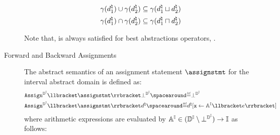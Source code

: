 \begin{description}
\begin{definition}
  \begin{align*}
    \gamma(d^\natural_1) \cup \gamma(d^\natural_2) &\subseteq \gamma(d^\natural_1 \sqcup d^\natural_2) \\
    \gamma(d^\natural_1) \cap \gamma(d^\natural_2) &\subseteq \gamma(d^\natural_1 \sqcap d^\natural_2)
  \end{align*}
  \end{definition}
  Note that,  is always satisfied for best abstractions operators, \cf{} .
  \item[Forward and Backward Assignments]
  The abstract semantics of an assignment statement $\assignstmt$ for the interval abstract domain is defined as:
  \begin{align*}
    &\intervalabstractdomainassign \semanticsof{\assignstmt}\intervalabstractdomainbottom \DefeQ \intervalabstractdomainbottom \\
    &\intervalabstractdomainassign \semanticsof{\assignstmt}\defabstractvalue \DefeQ \updatemem{\defabstractvalue}{\defvariable}{\intervalaexp \semanticsof{\defaexp}} \\
  \end{align*}
  where arithmetic expressions are evaluated by $\mathbb{A}^{\mathbb{I}}\in{(\mathbb{D}^{\mathbb{I}}\setminus \bot^{\mathbb{D}^{\mathbb{I}}})}\to\mathbb{I}$ as follows:
\end{description}
